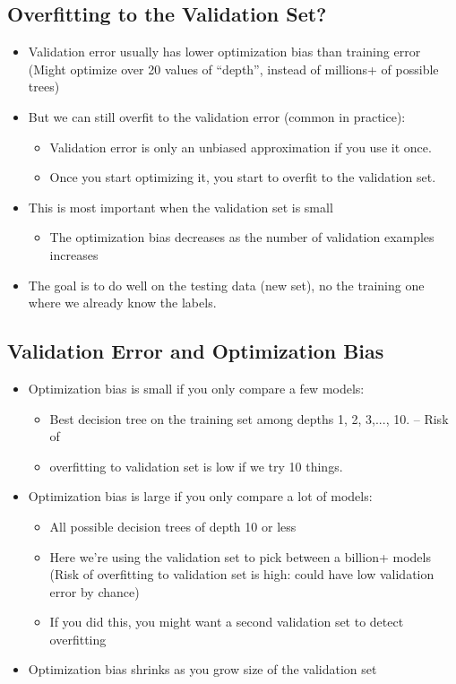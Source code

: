 \documentclass{article}
\theoremstyle{definition}
\begin{document}
\subsection*{Overfitting to the Validation Set?}
\begin{itemize}
	\item {\color{OliveGreen} Validation error usually has lower optimization bias than training error} (Might optimize over 20 values of “depth”, instead of millions+ of possible trees)
	\item But we can {\color{red} still overfit} to the validation error (common in practice):
	\begin{itemize}
		\item Validation error is {\color{OliveGreen} only an unbiased approximation if you use it once}.
		\item Once you start optimizing it, you start to overfit to the validation set.
	\end{itemize}
	\item This is most important when the validation set is small 
	\begin{itemize}
		\item The {\color{OliveGreen} optimization bias decreases as the number of validation examples increases}
	\end{itemize}
\item The goal is to do well on the testing data (new set), no the training one where we already know the labels. 
\end{itemize}

\subsection*{Validation Error and Optimization Bias}
\begin{itemize}
	\item {\color{red} Optimization bias} is {\color{OliveGreen} small if you only compare a few} models:
	\begin{itemize}
		\item Best decision tree on the training set among depths 1, 2, 3,..., 10. – Risk of \item overfitting to validation set is low if we try 10 things.
	\end{itemize}
\item {\color{red} Optimization bias} is {\color{OliveGreen} large if you only compare a lot} of models:
\begin{itemize}
	\item All possible decision trees of depth 10 or less
	\item Here we’re using the validation set to pick between a billion+ models (Risk of overfitting to validation set is high: could have {\color{red} low validation error by chance})
	\item If you did this, you might want a {\color{OliveGreen} second validation} set to detect overfitting
\end{itemize}
\item {\color{OliveGreen} Optimization bias shrinks as you grow size} of the validation set
\end{itemize}
\end{document}
